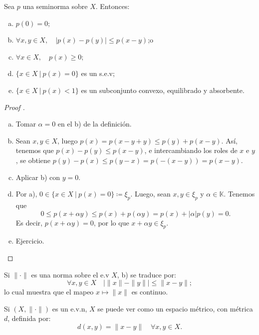 \begin{property}
	Sea $p$ una seminorma sobre $X$. Entonces:
	\begin{enumerate}[a)]
		\item $p(0) = 0$;

		\item $\forall x,y \in X, \quad |p(x) - p(y)| \leq p(x - y)$;o
		
		\item $\forall x \in X, \quad p(x) \geq 0$;

		\item $\{x \in X \ | \ p(x) = 0\}$ es un s.e.v;

		\item $\{x \in X \ | \ p(x) < 1\}$ es un subconjunto convexo, equilibrado y absorbente.
	\end{enumerate}
\end{property}
\begin{proof}[Proof ]
	\begin{enumerate}[a)]
		\item Tomar $\alpha = 0$ en el b) de la definición.

		\item Sean $x,y \in X$, luego $p(x) = p(x - y + y) \leq p(y) + p(x - y)$. Así, tenemos que $p(x) - p(y) \leq p(x - y)$, e intercambiando los roles de $x$ e $y$, se obtiene $p(y) - p(x) \leq p(y - x) = p(-(x - y)) = p(x-y)$.

		\item Aplicar b) con $y = 0$.

		\item Por a), $0 \in \{x \in X \ | \ p(x) = 0\} \coloneq \xi_{p}$. Luego, sean $x,y \in \xi_{p}$ y $\alpha \in \mathbb{K}$. Tenemos que
		\[ 0 \leq p(x + \alpha y) \leq p(x) + p(\alpha y) = p(x) + |\alpha| p(y) = 0. \]
		Es decir, $p(x + \alpha y) = 0$, por lo que $x + \alpha y \in \xi_{p}$.

		\item Ejercicio.
	\end{enumerate}
\end{proof}

\begin{observe}
	Si $\| \cdot \|$ es una norma sobre el e.v $X$, b) se traduce por: 
	\[ \forall x,y \in X \quad \big| \| x \| - \| y \| \big| \leq \| x - y \|; \]
	lo cual muestra que el mapeo $x \mapsto \| x \|$ es continuo. \par
	Si $(X, \| \cdot \|)$ es un e.v.n, $X$ se puede ver como un espacio métrico, con métrica $d$, definida por:
	\[ d(x,y) = \| x - y \| \quad \forall x,y \in X. \]
\end{observe}

